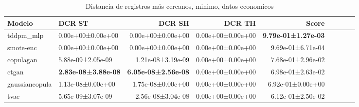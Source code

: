 \begin{table}[H]
\centering
\fontsize{10}{14}\selectfont
\caption{Distancia de registros más cercanos, minimo, datos economicos}
\label{table-dcr-economicos-a}
\begin{tabular}{|l|l|r|r|r|r|r|r|r|}
\hline
\rowcolor[gray]{0.8}
Modelo & DCR ST & DCR SH & DCR TH & \textbf{Score} \\
\hline tddpm\_mlp & \cellcolor[rgb]{0.9, 0.54, 0.52} 0.00e+00±0.00e+00 & \cellcolor[rgb]{0.9, 0.54, 0.52} 0.00e+00±0.00e+00 & 0.00e+00±0.00e+00 & \bfseries 9.79e-01±1.27e-03 \\
\hline smote-enc & \cellcolor[rgb]{0.9, 0.54, 0.52} 0.00e+00±0.00e+00 & \cellcolor[rgb]{0.9, 0.54, 0.52} 0.00e+00±0.00e+00 & 0.00e+00±0.00e+00 & 9.69e-01±6.71e-04 \\
\hline copulagan & 5.88e-09±2.05e-09 & 1.21e-08±3.19e-09 & 0.00e+00±0.00e+00 & 7.68e-01±2.96e-02 \\
\hline ctgan & \bfseries 2.83e-08±3.88e-08 & \bfseries 6.05e-08±2.56e-08 & 0.00e+00±0.00e+00 & 6.98e-01±2.63e-02 \\
\hline gaussiancopula & 1.13e-08±0.00e+00 & 1.75e-08±0.00e+00 & 0.00e+00±0.00e+00 & 6.92e-01±0.00e+00 \\
\hline tvae & 5.65e-09±3.07e-09 & 2.56e-08±3.04e-08 & 0.00e+00±0.00e+00 & \cellcolor[rgb]{0.9, 0.54, 0.52} 6.12e-01±2.50e-02 \\
\hline
\end{tabular}
\end{table}
